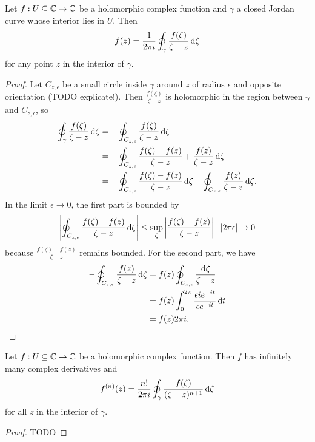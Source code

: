 \begin{theorem}
Let $f: U\subseteq \mathbb{C} \to \mathbb{C}$ be a holomorphic complex function and $\gamma$ a closed Jordan curve whose interior lies in $U$. Then
\[ f(z) = \frac{1}{2\pi i}\oint_\gamma \frac{f(\zeta)}{\zeta - z}\operatorname{d \!}{\zeta} \]
for any point $z$ in the interior of $\gamma$.
\end{theorem}
\begin{proof}
Let $C_{z,\epsilon}$ be a small circle inside $\gamma$ around $z$ of radius $\epsilon$ and opposite orientation (TODO explicate!). Then $\frac{f(\zeta)}{\zeta - z}$ is holomorphic in the region between $\gamma$ and $C_{z,\epsilon}$, so
\begin{align*}
\oint_\gamma \frac{f(\zeta)}{\zeta - z}\operatorname{d \!}{\zeta} &= -\oint_{C_{z,\epsilon}} \frac{f(\zeta)}{\zeta - z}\operatorname{d \!}{\zeta} \\
&= -\oint_{C_{z,\epsilon}} \frac{f(\zeta)-f(z)}{\zeta - z} + \frac{f(z)}{\zeta - z}\operatorname{d \!}{\zeta} \\
&= -\oint_{C_{z,\epsilon}} \frac{f(\zeta)-f(z)}{\zeta - z}\operatorname{d \!}{\zeta} -\oint_{C_{z,\epsilon}}\frac{f(z)}{\zeta - z}\operatorname{d \!}{\zeta}.
\end{align*}
In the limit $\epsilon \to 0$, the first part is bounded by
\[ \left|\oint_{C_{z,\epsilon}} \frac{f(\zeta)-f(z)}{\zeta - z}\operatorname{d \!}{\zeta}\right| \leq \sup_\zeta\left|\frac{f(\zeta)-f(z)}{\zeta - z}\right| \cdot |2\pi\epsilon| \to 0 \]
because $\frac{f(\zeta)-f(z)}{\zeta - z}$ remains bounded. For the second part, we have
\begin{align*}
-\oint_{C_{z,\epsilon}} \frac{f(z)}{\zeta - z}\operatorname{d \!}{\zeta} &= f(z)\oint_{C_{z,\epsilon}} \frac{\operatorname{d \!}{\zeta}}{\zeta - z} \\
&= f(z)\int_0^{2\pi}\frac{\epsilon ie^{-it}}{\epsilon e^{-it}}\operatorname{d \!}{t} \\
&= f(z)2\pi i.
\end{align*}
\end{proof}
\begin{corollary}
Let $f: U\subseteq \mathbb{C} \to \mathbb{C}$ be a holomorphic complex function. Then $f$ has infinitely many complex derivatives and
\[ f^{(n)}(z) = \frac{n!}{2\pi i}\oint_\gamma \frac{f(\zeta)}{(\zeta-z)^{n+1}}\operatorname{d \!}{\zeta} \]
for all $z$ in the interior of $\gamma$.
\end{corollary}
\begin{proof}
TODO
\end{proof}

